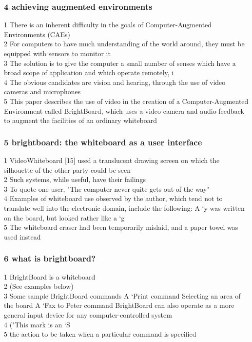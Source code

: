 \documentclass{beamer}
\begin{document}
\begin{frame}
\frametitle{4 achieving augmented environments}
1  There is an inherent difficulty in the goals of Computer-Augmented Environments (CAEs) \\2  For computers to have much understanding of the world around, they must be equipped with sensors to monitor it \\3      The solution is to give the computer a small number of senses which have a broad scope of application and which operate remotely, i \\4  The obvious candidates are vision and hearing, through the use of video cameras and microphones \\5      This paper describes the use of video in the creation of a Computer-Augmented Environment called BrightBoard, which uses a video camera and audio feedback to augment the facilities of an ordinary whiteboard \\
\end{frame}
\begin{frame}
\frametitle{5 brightboard: the whiteboard as a user interface}
1  VideoWhiteboard [15] used a translucent drawing screen on which the silhouette of the other party could be seen \\2      Such systems, while useful, have their failings \\3  To quote one user, "The computer never quite gets out of the way" \\4       Examples of whiteboard use observed by the author, which tend not to translate well into the electronic domain, include the following:           A `y was written on the board, but looked rather like a `g \\5        The whiteboard eraser had been temporarily mislaid, and a paper towel was used instead \\
\end{frame}
\begin{frame}
\frametitle{6 what is brightboard?}
1  BrightBoard    is a whiteboard \\2  (See examples below) \\3                            Some sample BrightBoard commands                                   A `Print command                              Selecting an area of the board                                A `Fax to Peter command                            BrightBoard can also operate as a more general input device for any computer-controlled system \\4  ("This mark is an `S \\5        the action to be taken when a particular command is specified \\
\end{frame}
\end{document}
